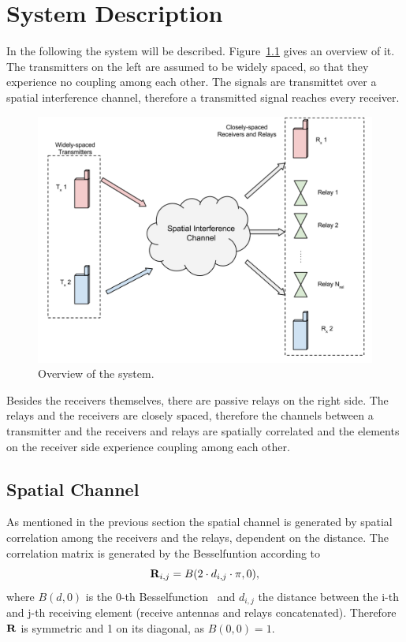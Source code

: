 \chapter{System Description}
\label{sec:system}

In the following the system will be described.
Figure~\ref{fig:system} gives an overview of it.
The transmitters on the left are assumed to be widely spaced, so that they experience no coupling among each other.
The signals are transmittet over a spatial interference channel, therefore a transmitted signal reaches every receiver.
\begin{figure}[h]
\begin{center}
\includegraphics[width=\textwidth]{images/System.png}
\caption{Overview of the system.}
\label{fig:system}
\end{center}
\end{figure}

Besides the receivers themselves, there are passive relays on the right side.
The relays and the receivers are closely spaced, therefore the channels between a transmitter and the receivers and relays are spatially correlated and the elements on the receiver side experience coupling among each other.

\section{Spatial Channel}
\label{sec:spatial}

As mentioned in the previous section the spatial channel is generated by spatial correlation among the receivers and the relays, dependent on the distance.
The correlation matrix is generated by the Besselfuntion according to
\begin{equation}
\label{eq:spatial_corr}
\mathbf{R}_{i,j} = B(2\cdot d_{i,j}\cdot \pi,0),
\end{equation}
where $B(d,0)$ is the 0-th Besselfunction~\cite[p.191]{Kreyszig} and $d_{i,j}$ the distance between the i-th and j-th receiving element (receive antennas and relays concatenated).
Therefore $\mathbf{R}$ is symmetric and 1 on its diagonal, as $B(0,0)=1$.

